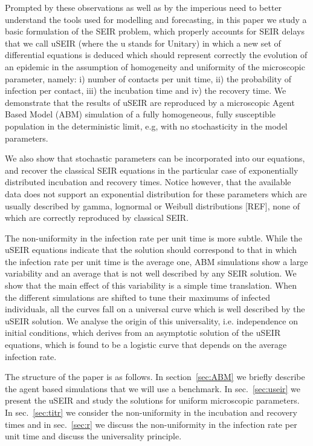 \documentclass[a4paper,oneside,11pt]{article}
\begin{document}
Prompted by these observations as well as by the imperious need to better understand the tools used for modelling and forecasting, in this paper we study a basic formulation of the SEIR problem, which properly accounts for SEIR delays that we call uSEIR (where the u stands for Unitary) in which a new set of differential equations is deduced which should represent correctly the evolution of an epidemic in the assumption of homogeneity and uniformity of the microscopic parameter, namely: i) number of contacts per unit time, ii) the probability of infection per contact, iii) the incubation time and iv) the recovery time. We demonstrate that the results of uSEIR are reproduced by a microscopic Agent Based Model (ABM) simulation of a fully homogeneous, fully susceptible population in the deterministic limit, e.g, with no stochasticity in the model parameters.

We also show that stochastic parameters can be incorporated into our equations, and recover the classical SEIR equations in the particular case of exponentially distributed incubation and recovery times. Notice however, that the available data does not support an exponential distribution for these parameters which are usually described by gamma, lognormal or Weibull distributions [REF], none of which are correctly reproduced by classical SEIR.

The non-uniformity in the infection rate per unit time is more subtle. While the uSEIR equations indicate that the solution should correspond to that in which the infection rate per unit time is the average one, ABM simulations show a large variability and an average that is not well described by any
SEIR solution. We show that the main effect of this variability is a simple time translation. When the different simulations are shifted to tune their maximums of infected individuals, all the curves fall on a universal curve which is well described by the uSEIR solution. We analyse the origin of this universality, i.e. independence on initial conditions, which derives from an asymptotic solution of the uSEIR equations, which is found to be a logistic curve that depends on the average infection rate.

The structure of the paper is as follows. In section~\ref{sec:ABM} we briefly describe the agent based simulations that we will use a benchmark.
In sec.~\ref{sec:useir} we present the uSEIR and study the solutions for uniform microscopic parameters. In sec.~\ref{sec:titr} we consider the
non-uniformity in the incubation and recovery times and in sec.~\ref{sec:r} we discuss the non-uniformity in the infection rate per unit time and discuss the universality principle.
\end{document}
